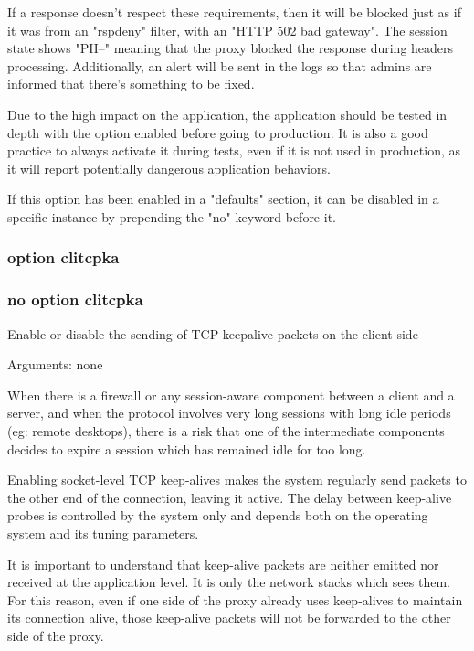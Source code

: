   If a response doesn't respect these requirements, then it will be blocked
  just as if it was from an "rspdeny" filter, with an "HTTP 502 bad gateway".
  The session state shows "PH--" meaning that the proxy blocked the response
  during headers processing. Additionally, an alert will be sent in the logs so
  that admins are informed that there's something to be fixed.

  Due to the high impact on the application, the application should be tested
  in depth with the option enabled before going to production. It is also a
  good practice to always activate it during tests, even if it is not used in
  production, as it will report potentially dangerous application behaviors.

  If this option has been enabled in a "defaults" section, it can be disabled
  in a specific instance by prepending the "no" keyword before it.

\subsubsection[option clitcpka]{option clitcpka}
\subsubsection[no option clitcpka]{no option clitcpka}


  Enable or disable the sending of TCP keepalive packets on the client side

                                 
  Arguments: none

  When there is a firewall or any session-aware component between a client and
  a server, and when the protocol involves very long sessions with long idle
  periods (eg: remote desktops), there is a risk that one of the intermediate
  components decides to expire a session which has remained idle for too long.

  Enabling socket-level TCP keep-alives makes the system regularly send packets
  to the other end of the connection, leaving it active. The delay between
  keep-alive probes is controlled by the system only and depends both on the
  operating system and its tuning parameters.

  It is important to understand that keep-alive packets are neither emitted nor
  received at the application level. It is only the network stacks which sees
  them. For this reason, even if one side of the proxy already uses keep-alives
  to maintain its connection alive, those keep-alive packets will not be
  forwarded to the other side of the proxy.


